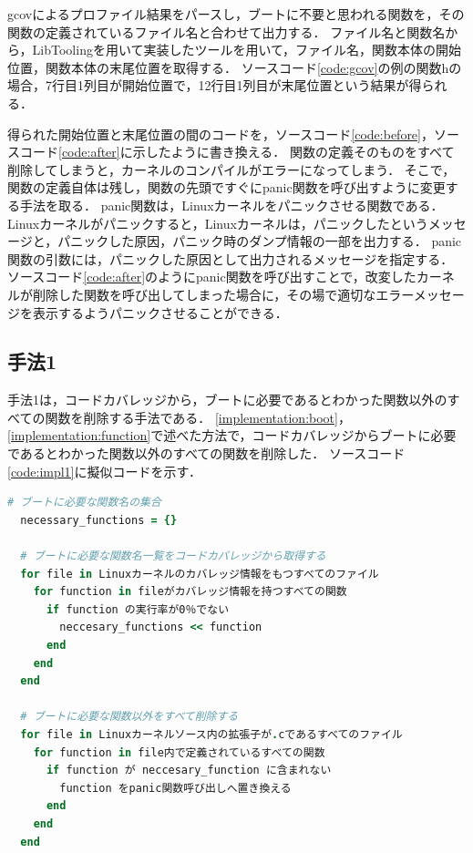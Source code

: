 \documentclass[graduation-thesis]{mlarticle}
\begin{document}
gcovによるプロファイル結果をパースし，ブートに不要と思われる関数を，その関数の定義されているファイル名と合わせて出力する．
ファイル名と関数名から，LibToolingを用いて実装したツールを用いて，ファイル名，関数本体の開始位置，関数本体の末尾位置を取得する．
ソースコード\ref{code:gcov}の例の関数hの場合，7行目1列目が開始位置で，12行目1列目が末尾位置という結果が得られる．

得られた開始位置と末尾位置の間のコードを，ソースコード\ref{code:before}，ソースコード\ref{code:after}に示したように書き換える．
関数の定義そのものをすべて削除してしまうと，カーネルのコンパイルがエラーになってしまう．
そこで，関数の定義自体は残し，関数の先頭ですぐにpanic関数を呼び出すように変更する手法を取る．
panic関数は，Linuxカーネルをパニックさせる関数である．Linuxカーネルがパニックすると，Linuxカーネルは，パニックしたというメッセージと，パニックした原因，パニック時のダンプ情報の一部を出力する．
panic関数の引数には，パニックした原因として出力されるメッセージを指定する．
ソースコード\ref{code:after}のようにpanic関数を呼び出すことで，改変したカーネルが削除した関数を呼び出してしまった場合に，その場で適切なエラーメッセージを表示するようパニックさせることができる．


\subsection{手法1}
\label{implementation:1}

手法1は，コードカバレッジから，ブートに必要であるとわかった関数以外のすべての関数を削除する手法である．
\ref{implementation:boot}，\ref{implementation:function}で述べた方法で，コードカバレッジからブートに必要であるとわかった関数以外のすべての関数を削除した．
ソースコード\ref{code:impl1}に擬似コードを示す．

\begin{lstlisting}[language=ruby, caption=手法1の擬似コード, label=code:impl1]
  # ブートに必要な関数名の集合
  necessary_functions = {}

  # ブートに必要な関数名一覧をコードカバレッジから取得する
  for file in Linuxカーネルのカバレッジ情報をもつすべてのファイル
    for function in fileがカバレッジ情報を持つすべての関数
      if function の実行率が0％でない
        neccesary_functions << function
      end
    end
  end

  # ブートに必要な関数以外をすべて削除する
  for file in Linuxカーネルソース内の拡張子が.cであるすべてのファイル
    for function in file内で定義されているすべての関数 
      if function が neccesary_function に含まれない
        function をpanic関数呼び出しへ置き換える
      end
    end
  end
\end{lstlisting}
\end{document}

